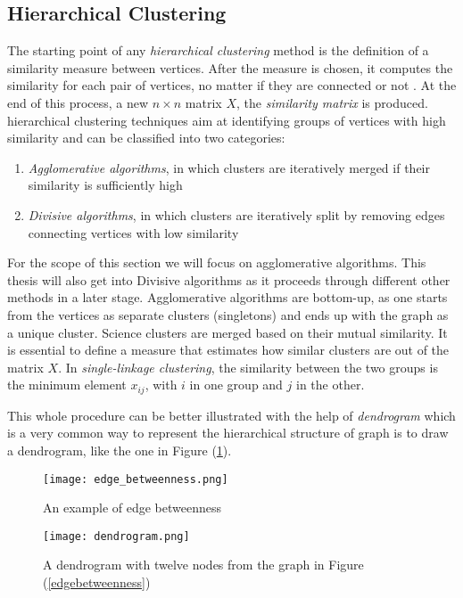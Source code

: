 {\subsection{Hierarchical Clustering}\label{sub:hierarchicalclustering}
The starting point of any \textit{hierarchical clustering} method is the definition of a similarity measure between vertices. After the measure is chosen, it computes the similarity for each pair of vertices, no matter if they are connected or not \cite{ref-6}. At the end of this process, a new $ n \times n$ matrix $X$, the \textit{similarity matrix} is produced. hierarchical clustering techniques aim at identifying groups of vertices with high similarity and can be classified into two categories:

\begin{enumerate}
	\item \textit{Agglomerative algorithms}, in which clusters are iteratively merged if their similarity is sufficiently high
	\item \textit{Divisive algorithms}, in which clusters are iteratively split by removing edges connecting vertices with low similarity
\end{enumerate}

For the scope of this section we will focus on agglomerative algorithms. This thesis will also get into Divisive algorithms as it proceeds through different other methods in a later stage. Agglomerative algorithms are bottom-up, as one starts from the vertices as separate clusters (singletons) and ends up with the graph as a unique cluster. Science clusters are merged based on their mutual similarity. It is essential to define a measure that estimates how similar clusters are out of the matrix $X$. In \textit{single-linkage clustering}, the similarity between the two groups is the minimum element $x_{ij}$, with $i$ in one group and $j$ in the other.

This whole procedure can be better illustrated with the help of \textit{dendrogram} which is a very common way to represent the hierarchical structure of graph is to draw a dendrogram, like the one in Figure (\ref{dendrogram}).

\begin{figure}[H]
	\centering
	\begin{minipage}[b]{0.5\textwidth}
		\centering
		\texttt{[image: edge\_betweenness.png]}
		\caption{An example of edge betweenness}
		\label{edgebetweenness}
	\end{minipage}
	\begin{minipage}[b]{0.45\textwidth}
		\centering
		\texttt{[image: dendrogram.png]}
		\caption{A dendrogram with twelve nodes from the graph in Figure (\ref{edgebetweenness})}
		\label{dendrogram}
	\end{minipage}
\end{figure}

}
